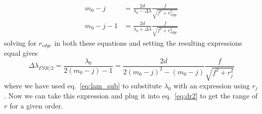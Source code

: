 \documentclass{article}
\begin{document}
\begin{align}
m_{0}-j&=\frac{2d}{\lambda_{0}-\Delta\lambda}\frac{f}{\sqrt{f^{2}+r_{edge}^{2}}}\\
m_{0}-j-1&=\frac{2d}{\lambda_{0}+\Delta\lambda}\frac{f}{\sqrt{f^{2}+r_{edge}^{2}}}
\end{align}
solving for $r_{edge}$ in both these equations and setting the resulting expressions equal gives
\begin{equation}
\Delta\lambda_{FSR/2}=\frac{\lambda_{0}}{2(m_{0}-j)-1}=\frac{2d}{2(m_{0}-j)^{2}-(m_{0}-j)}\frac{f}{\sqrt{f^{2}+r_{j}^{2}}}
\end{equation}
where we have used eq.~\ref{eq:lam_sub} to substitute $\lambda_{0}$ with an expression using $r_{j}$. Now we can take this expression and plug it into eq.~\ref{eq:dr2} to get the range of $r$ for a given order. 


%

%

\end{document}
